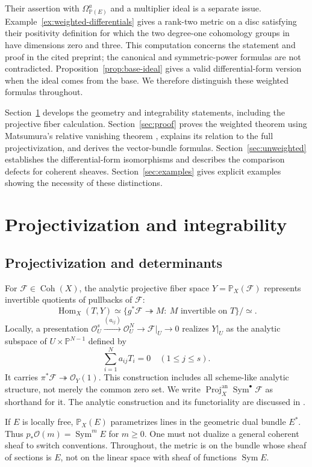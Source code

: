 \documentclass[11pt,reqno]{amsart}
\numberwithin{equation}{section}
\theoremstyle{definition}
\theoremstyle{remark}
\newcommand{\OO}{\mathcal O}
\newcommand{\FF}{\mathcal F}
\newcommand{\PP}{\mathbb P}
\newcommand{\Sym}{\operatorname{Sym}}
\newcommand{\Coh}{\operatorname{Coh}}
\DeclareMathOperator{\Proj}{Proj}
\begin{document}
Their assertion with $\Omega_{\PP(E)}^a$ and a multiplier ideal is a separate issue. Example~\ref{ex:weighted-differentials} gives a rank-two metric on a disc satisfying their positivity definition for which the two degree-one cohomology groups in \cite[Theorem 1.3(ii)]{LLYZpre} have dimensions zero and three. This computation concerns the statement and proof in the cited preprint; the canonical and symmetric-power formulas are not contradicted. Proposition~\ref{prop:base-ideal} gives a valid differential-form version when the ideal comes from the base. We therefore distinguish these weighted formulas throughout.

Section~\ref{sec:geometry} develops the geometry and integrability statements, including the projective fiber calculation. Section~\ref{sec:proof} proves the weighted theorem using Matsumura's relative vanishing theorem \cite{Matsumura}, explains its relation to the full projectivization, and derives the vector-bundle formulas. Section~\ref{sec:unweighted} establishes the differential-form isomorphisms and describes the comparison defects for coherent sheaves. Section~\ref{sec:examples} gives explicit examples showing the necessity of these distinctions.

\section{Projectivization and integrability}\label{sec:geometry}
\subsection{Projectivization and determinants}
For $\FF\in\Coh(X)$, the analytic projective fiber space $Y=\PP_X(\FF)$ represents invertible quotients of pullbacks of $\FF$:
\[
 \operatorname{Hom}_X(T,Y)
 \simeq\{g^*\FF\twoheadrightarrow M:\ M\text{ invertible on }T\}/\simeq.
\]
Locally, a presentation $\OO_U^s\xrightarrow{(a_{ij})}\OO_U^N\to\FF|_U\to0$ realizes $Y|_U$ as the analytic subspace of $U\times\PP^{N-1}$ defined by
\[
 \sum_{i=1}^N a_{ij}T_i=0\quad(1\leq j\leq s).
\]
It carries $\pi^*\FF\twoheadrightarrow\OO_Y(1)$. This construction includes all scheme-like analytic structure, not merely the common zero set. We write $\Proj_X^{\mathrm{an}}\Sym^\bullet\FF$ as shorthand for it. The analytic construction and its functoriality are discussed in \cite{Grothendieck}.

If $E$ is locally free, $\PP_X(E)$ parametrizes lines in the geometric dual bundle $E^*$. Thus $p_*\OO(m)=\Sym^m E$ for $m\geq0$. One must not dualize a general coherent sheaf to switch conventions. Throughout, the metric is on the bundle whose sheaf of sections is $E$, not on the linear space with sheaf of functions $\Sym E$.
\end{document}
